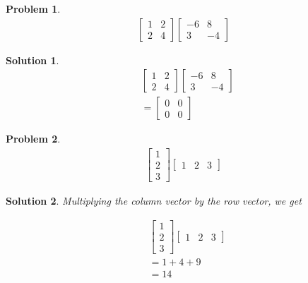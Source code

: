 \documentclass{article}
\newtheorem{problem}{Problem}
\newtheorem*{solution}{Solution}
\begin{document}
\begin{problem}
\begin{align*}
\begin{bmatrix}
1 & 2 \\ 2 & 4
\end{bmatrix} 
\begin{bmatrix}
-6 & 8 \\ 3 & -4
\end{bmatrix}
\end{align*}
\end{problem}

\begin{solution}
\begin{align*}
& \begin{bmatrix}
1 & 2 \\ 2 & 4
\end{bmatrix} 
\begin{bmatrix}
-6 & 8 \\ 3 & -4
\end{bmatrix} \\
&= \begin{bmatrix}
0 & 0 \\ 0 & 0
\end{bmatrix}
\end{align*}
\end{solution}

\begin{problem}
\begin{align*}
\begin{bmatrix}
1 \\ 2 \\ 3 
\end{bmatrix} 
\begin{bmatrix}
1 & 2 & 3
\end{bmatrix}
\end{align*}
\end{problem}

\begin{solution}
Multiplying the column vector by the row vector, we get

\begin{align*}
& \begin{bmatrix}
1 \\ 2 \\ 3 
\end{bmatrix} 
\begin{bmatrix}
1 & 2 & 3
\end{bmatrix} \\
&= 1 + 4 + 9 \\
&= 14
\end{align*}
\end{solution}
\end{document}
